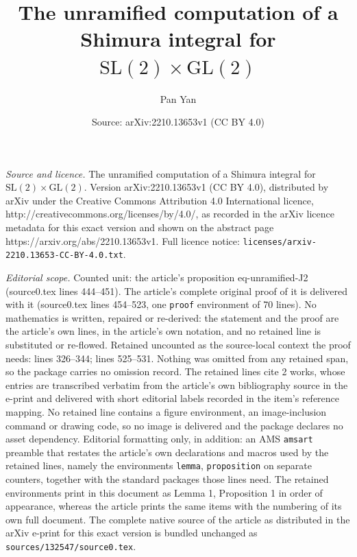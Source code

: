 \documentclass[10pt,a4paper]{amsart}
\title{The unramified computation of a Shimura integral for $\mathrm{SL}(2)\times \mathrm{GL}(2)$}
\author{Pan Yan}
\date{Source: arXiv:2210.13653v1 (CC BY 4.0)}
\begin{document}
\maketitle

\noindent\emph{Source and licence.} The unramified computation of a Shimura integral for $\mathrm{SL}(2)\times \mathrm{GL}(2)$. Version arXiv:2210.13653v1 (CC BY 4.0), distributed by arXiv under the Creative Commons Attribution 4.0 International licence, http://creativecommons.org/licenses/by/4.0/, as recorded in the arXiv licence metadata for this exact version and shown on the abstract page https://arxiv.org/abs/2210.13653v1. Full licence notice: \texttt{licenses/arxiv-2210.13653-CC-BY-4.0.txt}.\par\smallskip

\noindent\textit{Editorial scope.} Counted unit: the article's proposition eq-unramified-J2 (source0.tex lines 444--451). The article's complete original proof of it is delivered with it (source0.tex lines 454--523, one \texttt{proof} environment of 70 lines). No mathematics is written, repaired or re-derived: the statement and the proof are the article's own lines, in the article's own notation, and no retained line is substituted or re-flowed.  Retained uncounted as the source-local context the proof needs: lines 326--344; lines 525--531.  Nothing was omitted from any retained span, so the package carries no omission record.  The retained lines cite 2 works, whose entries are transcribed verbatim from the article's own bibliography source in the e-print and delivered with short editorial labels recorded in the item's reference mapping.  No retained line contains a figure environment, an image-inclusion command or drawing code, so no image is delivered and the package declares no asset dependency.  Editorial formatting only, in addition: an AMS \texttt{amsart} preamble that restates the article's own declarations and macros used by the retained lines, namely the environments \texttt{lemma}, \texttt{proposition} on separate counters, together with the standard packages those lines need.  The retained environments print in this document as Lemma 1, Proposition 1 in order of appearance, whereas the article prints the same items with the numbering of its own full document.  The complete native source of the article as distributed in the arXiv e-print for this exact version is bundled unchanged as \texttt{sources/132547/source0.tex}.
\end{document}

